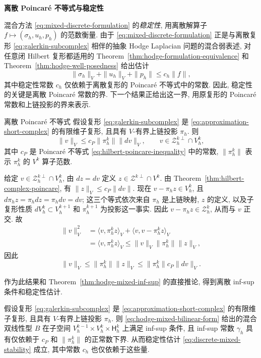 \medskip\noindent\textbf{{离散 Poincaré 不等式与稳定性}}\par
混合方法 \eqref{eq:mixed-discrete-formulation} 的\emph{稳定性}, 用离散解算子 $f\mapsto(\sigma_h,u_h,p_h)$ 的范数衡量. 由于 \eqref{eq:mixed-discrete-formulation} 正是与离散复形 \eqref{eq:galerkin-subcomplex} 相伴的抽象 Hodge Laplacian 问题的混合弱表述, 对任意闭 Hilbert 复形都适用的 Theorem~\ref{thm:hodge-formulation-equivalence} 和 Theorem~\ref{thm:hodge-well-posedness} 给出估计
\begin{equation}\label{eq:discrete-mixed-stability}
\|\sigma_h\|_V+\|u_h\|_V+\|p_h\|\leq c_h\|f\|,
\end{equation}
其中稳定性常数 $c_h$ 仅依赖于离散复形的 Poincaré 不等式中的常数. 因此, 稳定性的关键是离散 Poincaré 常数的界. 下一个结果正给出这一界, 用原复形的 Poincaré 常数和上链投影的界来表示.

\begin{Theorem}{{离散 Poincaré 不等式}}\label{thm:discrete-poincare}
假设复形 \eqref{eq:galerkin-subcomplex} 是 \eqref{eq:approximation-short-complex} 的有限维子复形, 且具有 $V$-有界上链投影 $\pi_h$. 则
\[
\|v\|_V\leq c_P\|\pi_h^k\|\|dv\|_V,\qquad v\in\mathcal Z_h^{k\perp}\cap V_h^k,
\]
其中 $c_P$ 是 Poincaré 不等式 \eqref{eq:hilbert-poincare-inequality} 中的常数, $\|\pi_h^k\|$ 表示 $\pi_h^k$ 的 $V^k$ 算子范数.
\end{Theorem}

\begin{Proof}
给定 $v\in\mathcal Z_h^{k\perp}\cap V_h^k$, 由 $dz=dv$ 定义 $z\in\mathcal Z^{k\perp}\cap V^k$. 由 Theorem~\ref{thm:hilbert-complex-poincare}, 有 $\|z\|_V\leq c_P\|dv\|$. 现在 $v-\pi_hz\in V_h^k$, 且 $d\pi_hz=\pi_hdz=\pi_hdv=dv$; 这三个等式依次来自 $\pi_h$ 是上链映射, $z$ 的定义, 以及子复形性质 $dV_h^k\subset V_h^{k+1}$ 和 $\pi_h^{k+1}$ 为投影这一事实. 因此 $v-\pi_hz\in\mathcal Z_h^k$, 从而与 $v$ 正交. 故
\[
\begin{aligned}
\|v\|_V^2&=\langle v,\pi_h^kz\rangle_V+\langle v,v-\pi_h^kz\rangle_V\\
&=\langle v,\pi_h^kz\rangle_V\leq\|v\|_V\|\pi_h^k\|\|z\|_V,
\end{aligned}
\]
因此
\[
\|v\|_V\leq\|\pi_h^k\|\|z\|_V\leq\|\pi_h^k\|c_P\|dv\|_V.
\]
\end{Proof}

作为此结果和 Theorem~\ref{thm:hodge-mixed-inf-sup} 的直接推论, 得到离散 inf-sup 条件和稳定性估计.

\begin{Theorem}\label{thm:discrete-mixed-inf-sup}
假设复形 \eqref{eq:galerkin-subcomplex} 是 \eqref{eq:approximation-short-complex} 的有限维子复形, 且具有 $V$-有界上链投影 $\pi_h$. 则 \eqref{eq:hodge-mixed-bilinear-form} 给出的混合双线性型 $B$ 在子空间 $V_h^{k-1}\times V_h^k\times\mathsf H_h^k$ 上满足 inf-sup 条件, 且 inf-sup 常数 $\gamma_h$ 具有仅依赖于 $c_P$ 和 $\|\pi_h^k\|$ 的正常数下界. 从而稳定性估计 \eqref{eq:discrete-mixed-stability} 成立, 其中常数 $c_h$ 也仅依赖于这些量.
\end{Theorem}

